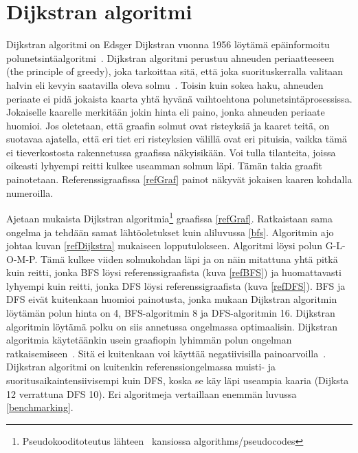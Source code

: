 \section{Dijkstran algoritmi}\label{dijkstra}
Dijkstran algoritmi on Edsger Dijkstran vuonna 1956 löytämä epäinformoitu 
po\-lun\-etsintäalgoritmi~\cite{applSciLawande}. Dijkstran algoritmi perustuu 
ahneuden periaatteeseen (the principle of greedy), joka tarkoittaa sitä, että 
joka suorituskerralla valitaan halvin eli kevyin saatavilla oleva 
solmu~\cite{mazeGameTrilogi}. Toisin kuin sokea haku, ahneuden periaate ei pidä 
jokaista kaarta yhtä hyvänä vaihtoehtona polunetsintäprosessissa. Jokaiselle 
kaarelle merkitään jokin hinta eli paino, jonka ahneuden periaate huomioi. Jos 
oletetaan, että graafin solmut ovat risteyksiä ja kaaret teitä, on suotavaa 
ajatella, että eri tiet eri risteyksien välillä ovat eri pituisia, vaikka tämä 
ei tieverkostosta rakennetussa graafissa näkyisikään. Voi tulla tilanteita, 
joissa oikeasti lyhyempi reitti kulkee useamman solmun läpi. Tämän takia 
graafit painotetaan. Referenssigraafissa \ref{refGraf} painot näkyvät jokaisen 
kaaren kohdalla numeroilla. \par
	Ajetaan \textcite{applSciLawande} mukaista Dijkstran 
algoritmia\footnote{Pseudokooditoteutus lähteen~\cite{gt2} kansiossa 
algorithms/pseudocodes} graafissa \ref{refGraf}. Ratkaistaan sama ongelma ja 
tehdään samat lähtöoletukset kuin aliluvussa \ref{bfs}. Algoritmin ajo johtaa 
kuvan \ref{refDijkstra} mukaiseen lopputulokseen. Algoritmi löysi polun 
G-L-O-M-P. Tämä kulkee viiden solmukohdan läpi ja on näin mitattuna yhtä pitkä 
kuin reitti, jonka BFS löysi referenssigraafista (kuva \ref{refBFS}) ja 
huomattavasti lyhyempi kuin reitti, jonka DFS löysi referenssigraafista (kuva 
\ref{refDFS}). BFS ja DFS eivät kuitenkaan huomioi painotusta, jonka mukaan 
Dijkstran algoritmin löytämän polun hinta on 4, BFS-algoritmin 8 ja 
DFS-algoritmin 16. Dijkstran algoritmin löytämä polku on siis annetussa 
ongelmassa optimaalisin. Dijkstran algoritmia käytetäänkin usein graafiopin 
lyhimmän polun ongelman ratkaisemiseen~\cite{IOPDijkstra}. Sitä ei kuitenkaan 
voi käyttää negatiivisilla painoarvoilla~\cite{applSciLawande}. Dijkstran 
algoritmi on kuitenkin referenssiongelmassa muisti- ja 
suoritusaikaintensiivisempi kuin DFS, koska se käy läpi useampia kaaria 
(Dijksta 12 verrattuna DFS 10). Eri algoritmeja vertaillaan enemmän luvussa 
\ref{benchmarking}.

